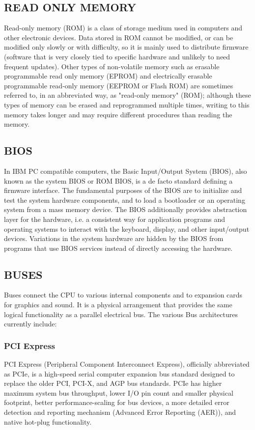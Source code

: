 \documentclass[a4paper,28pt]{report}
\begin{document}
\subsection*{READ ONLY MEMORY}
	Read-only memory (ROM) is a class of storage medium used in computers and other electronic devices. Data
	stored in ROM cannot be modified, or can be modified only slowly or with difficulty, so it is mainly used to
	distribute firmware (software that is very closely tied to specific hardware and unlikely to need frequent
	updates). Other types of non-volatile memory such as erasable programmable read only memory (EPROM)
	and electrically erasable programmable read-only memory (EEPROM or Flash ROM) are sometimes referred to,
	in an abbreviated way, as "read-only memory" (ROM); although these types of memory can be erased and reprogrammed
	multiple times, writing to this memory takes longer and may require different procedures than
	reading the memory.
\subsection*{BIOS}
	In IBM PC compatible computers, the Basic Input/Output System (BIOS), also known as the system
	BIOS or ROM BIOS, is a de facto standard defining a firmware interface. The fundamental purposes of the
	BIOS are to initialize and test the system hardware components, and to load a bootloader or an operating
	system from a mass memory device. The BIOS additionally provides abstraction layer for the hardware, i.e. a
	consistent way for application programs and operating systems to interact with the keyboard, display, and other
	input/output devices. Variations in the system hardware are hidden by the BIOS from programs that use BIOS
	services instead of directly accessing the hardware.
\subsection*{BUSES}
	Buses connect the CPU to various internal components and to expansion cards for graphics and sound. It is a
	physical arrangement that provides the same logical functionality as a parallel electrical bus.\newline
	The various Bus architectures currently include:
\subsubsection*{PCI Express}
 	PCI Express (Peripheral Component Interconnect Express), officially abbreviated as PCIe, is
	 a high-speed serial computer expansion bus standard designed to replace the older PCI, PCI-X,
	 and AGP bus standards. PCIe has higher maximum system bus throughput, lower I/O pin count and smaller physical 		footprint,
	 better performance-scaling for bus devices, a more detailed error detection and reporting mechanism
	 (Advanced Error Reporting (AER)), and native hot-plug functionality.
\end{document}
